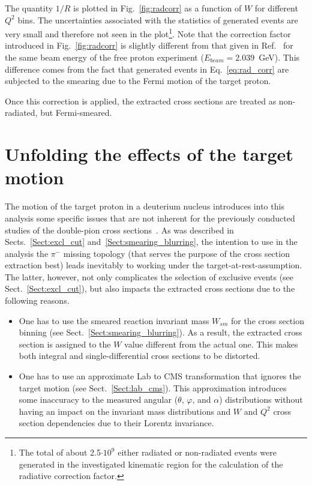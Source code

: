 The quantity $1/R$ is plotted in Fig.~\ref{fig:radcorr} as a function of $W$ for different $Q^{2}$ bins. The uncertainties associated with the statistics of generated events are very small and therefore not seen in the plot\footnote[3]{The total of about 2.5$\cdot 10^{9}$ either radiated or non-radiated events were generated in the investigated kinematic region for the calculation of the radiative correction factor.}. Note that the correction factor introduced in Fig.~\ref{fig:radcorr} is slightly different from that given in Ref.~\cite{Fed_an_note:2017} for the same beam energy of the free proton experiment ($E_{beam} = 2.039$~GeV). This difference comes from the fact that generated events in Eq.~\eqref{eq:rad_corr} are subjected to the smearing due to the Fermi motion of the target proton. 

Once this correction is applied, the extracted cross sections are treated as non-radiated, but Fermi-smeared.


\section{Unfolding the effects of the target motion}
\label{Sect:fermi_corr}


The motion of the target proton in a deuterium nucleus introduces into this analysis some specific issues that are not inherent for the previously conducted studies of the double-pion cross sections~\cite{Rip_an_note:2002,Ripani:2002ss,Fed_an_note:2007,Fedotov:2008aa,Isupov:2017lnd,Arjun,Fed_an_note:2017,Fed_paper_2018}. As was described in Sects.~\ref{Sect:excl_cut} and~\ref{Sect:smearing_blurring}, the intention to use in the analysis the $\pi^{-}$ missing topology (that serves the purpose of the cross section extraction best) leads inevitably to working under the target-at-rest-assumption. The latter, however, not only complicates the selection of exclusive events (see Sect.~\ref{Sect:excl_cut}), but also impacts the extracted cross sections due to the following reasons.

\begin{itemize}

\item  One has to use the smeared reaction invariant mass $W_{sm}$ for the cross section binning (see Sect.~\ref{Sect:smearing_blurring}). As a result, the extracted cross section is assigned to the $W$ value different from the actual one. This makes both integral and single-differential cross sections to be distorted. 

 
\item  One has to use an approximate Lab to CMS transformation that ignores the target motion (see Sect.~\ref{Sect:lab_cms}). This approximation introduces some inaccuracy to the measured angular ($\theta$, $\varphi$, and $\alpha$) distributions without having an impact on the invariant mass distributions and $W$ and $Q^{2}$ cross section dependencies due to their Lorentz invariance. 


\end{itemize}

